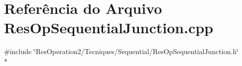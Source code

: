 \section{Referência do Arquivo Res\+Op\+Sequential\+Junction.\+cpp}
\label{_res_op_sequential_junction_8cpp}
{\ttfamily \#include \char`\"{}Res\+Operation2/\+Tecniques/\+Sequential/\+Res\+Op\+Sequential\+Junction.\+h\char`\"{}}\\*
